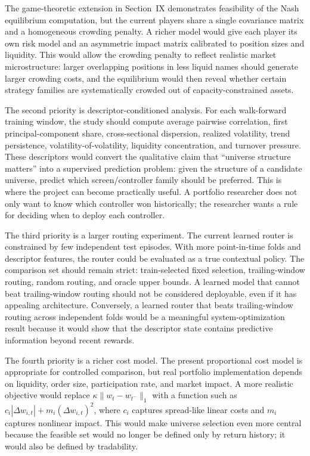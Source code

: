 \documentclass[journal,10pt]{IEEEtran}
\begin{document}
The game-theoretic extension in Section~IX demonstrates feasibility of the Nash equilibrium computation, but the current players share a single covariance matrix and a homogeneous crowding penalty. A richer model would give each player its own risk model and an asymmetric impact matrix calibrated to position sizes and liquidity. This would allow the crowding penalty to reflect realistic market microstructure: larger overlapping positions in less liquid names should generate larger crowding costs, and the equilibrium would then reveal whether certain strategy families are systematically crowded out of capacity-constrained assets.

The second priority is descriptor-conditioned analysis. For each walk-forward training window, the study should compute average pairwise correlation, first principal-component share, cross-sectional dispersion, realized volatility, trend persistence, volatility-of-volatility, liquidity concentration, and turnover pressure. These descriptors would convert the qualitative claim that ``universe structure matters'' into a supervised prediction problem: given the structure of a candidate universe, predict which screen/controller family should be preferred. This is where the project can become practically useful. A portfolio researcher does not only want to know which controller won historically; the researcher wants a rule for deciding when to deploy each controller.

The third priority is a larger routing experiment. The current learned router is constrained by few independent test episodes. With more point-in-time folds and descriptor features, the router could be evaluated as a true contextual policy. The comparison set should remain strict: train-selected fixed selection, trailing-window routing, random routing, and oracle upper bounds. A learned model that cannot beat trailing-window routing should not be considered deployable, even if it has appealing architecture. Conversely, a learned router that beats trailing-window routing across independent folds would be a meaningful system-optimization result because it would show that the descriptor state contains predictive information beyond recent rewards.

The fourth priority is a richer cost model. The present proportional cost model is appropriate for controlled comparison, but real portfolio implementation depends on liquidity, order size, participation rate, and market impact. A more realistic objective would replace $\kappa\|w_t-w_{t^-}\|_1$ with a function such as $c_i|\Delta w_{i,t}|+m_i(\Delta w_{i,t})^2$, where $c_i$ captures spread-like linear costs and $m_i$ captures nonlinear impact. This would make universe selection even more central because the feasible set would no longer be defined only by return history; it would also be defined by tradability.
\end{document}
